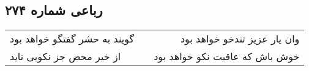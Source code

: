 \begin{center}
\section*{رباعی شماره ۲۷۴}
\label{sec:sh274}
\begin{longtable}{l p{0.5cm} r}
گویند به حشر گفتگو خواهد بود
&&
وان یار عزیز تندخو خواهد بود
\\
از خیر محض جز نکویی ناید
&&
خوش باش که عاقبت نکو خواهد بود
\\
\end{longtable}
\end{center}
